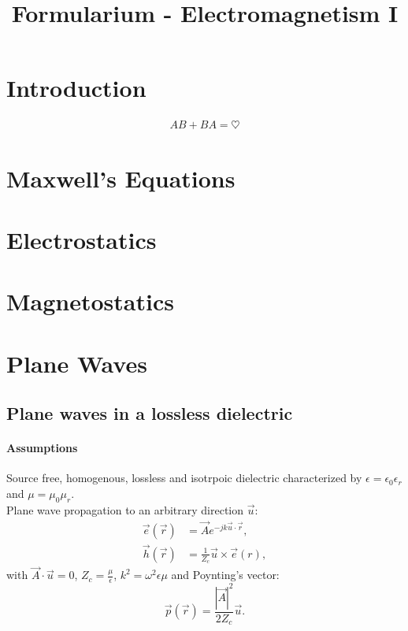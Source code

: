 \documentclass[a4paper, 10pt]{article}
\title{Formularium - Electromagnetism I}
\author{}
\date{}
\begin{document}
    
    \maketitle

    \section{Introduction}
    \begin{align}
        AB + BA = \heartsuit
    \end{align}
    \section{Maxwell's Equations}
    \section{Electrostatics}
    \section{Magnetostatics}
    \section{Plane Waves}
    \subsection{Plane waves in a lossless dielectric}
    \paragraph{Assumptions}
    Source free, homogenous, lossless and isotrpoic dielectric characterized by $\epsilon=\epsilon_0\epsilon_r$ and $\mu=\mu_0\mu_r$.\\
    Plane wave propagation to an arbitrary direction $\vec{u}$:
    \begin{align}
        \vec{e}(\vec{r}) & = \vec{A}e^{-jk\vec{u}\cdot \vec{r}} \label{H5eq1},\\
        \vec{h}(\vec{r}) & = \frac{1}{Z_c}\vec{u}\times \vec{e}(r) \label{H5eq2},
    \end{align}
    with $\vec{A}\cdot \vec{u} = 0$, $Z_c = \frac{\mu}{\epsilon}$, $k^2=\omega^2\epsilon\mu$ and Poynting's vector: 
    \begin{equation}\vec{p}(\vec{r})=\frac{|\vec{A}|^2}{2Z_c}\vec{u}.\label{H5eq3}\end{equation}
\end{document}

